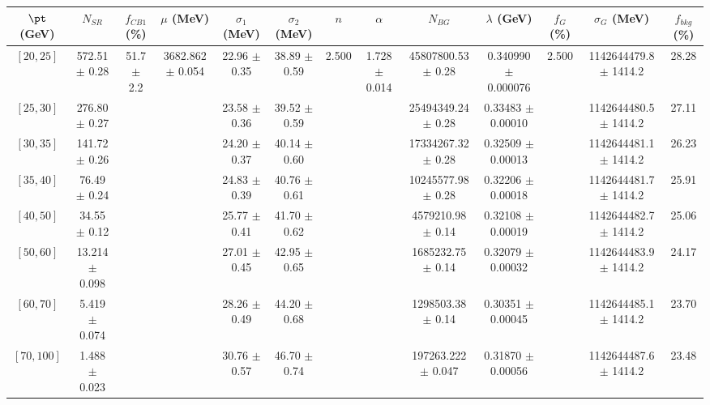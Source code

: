 \begin{tabular}{c||c|c|c|c|c|c|c|c|c|c|c||c}
$\pt$ (GeV) & $N_{SR}$ & $f_{CB1}$ (\%) & $\mu$ (MeV) & $\sigma_1$ (MeV) & $\sigma_2$ (MeV) & $n$ & $\alpha$ & $N_{BG}$ & $\lambda$ (GeV) & $f_G$ (\%) & $\sigma_G$ (MeV) & $f_{bkg}$ (\%) \\
\hline
$[20, 25]$ & 572.51 $\pm$ 0.28 & \multirow{8}{*}{51.7 $\pm$ 2.2} & \multirow{8}{*}{3682.862 $\pm$ 0.054} & 22.96 $\pm$ 0.35 & 38.89 $\pm$ 0.59 & \multirow{8}{*}{2.500} & \multirow{8}{*}{1.728 $\pm$ 0.014} & 45807800.53 $\pm$ 0.28 & 0.340990 $\pm$ 0.000076 & \multirow{8}{*}{2.500} & 1142644479.8 $\pm$ 1414.2 & 28.28\\
$[25, 30]$ & 276.80 $\pm$ 0.27 &  &  & 23.58 $\pm$ 0.36 & 39.52 $\pm$ 0.59 &  &  & 25494349.24 $\pm$ 0.28 & 0.33483 $\pm$ 0.00010 &  & 1142644480.5 $\pm$ 1414.2 & 27.11\\
$[30, 35]$ & 141.72 $\pm$ 0.26 &  &  & 24.20 $\pm$ 0.37 & 40.14 $\pm$ 0.60 &  &  & 17334267.32 $\pm$ 0.28 & 0.32509 $\pm$ 0.00013 &  & 1142644481.1 $\pm$ 1414.2 & 26.23\\
$[35, 40]$ & 76.49 $\pm$ 0.24 &  &  & 24.83 $\pm$ 0.39 & 40.76 $\pm$ 0.61 &  &  & 10245577.98 $\pm$ 0.28 & 0.32206 $\pm$ 0.00018 &  & 1142644481.7 $\pm$ 1414.2 & 25.91\\
$[40, 50]$ & 34.55 $\pm$ 0.12 &  &  & 25.77 $\pm$ 0.41 & 41.70 $\pm$ 0.62 &  &  & 4579210.98 $\pm$ 0.14 & 0.32108 $\pm$ 0.00019 &  & 1142644482.7 $\pm$ 1414.2 & 25.06\\
$[50, 60]$ & 13.214 $\pm$ 0.098 &  &  & 27.01 $\pm$ 0.45 & 42.95 $\pm$ 0.65 &  &  & 1685232.75 $\pm$ 0.14 & 0.32079 $\pm$ 0.00032 &  & 1142644483.9 $\pm$ 1414.2 & 24.17\\
$[60, 70]$ & 5.419 $\pm$ 0.074 &  &  & 28.26 $\pm$ 0.49 & 44.20 $\pm$ 0.68 &  &  & 1298503.38 $\pm$ 0.14 & 0.30351 $\pm$ 0.00045 &  & 1142644485.1 $\pm$ 1414.2 & 23.70\\
$[70, 100]$ & 1.488 $\pm$ 0.023 &  &  & 30.76 $\pm$ 0.57 & 46.70 $\pm$ 0.74 &  &  & 197263.222 $\pm$ 0.047 & 0.31870 $\pm$ 0.00056 &  & 1142644487.6 $\pm$ 1414.2 & 23.48\\
\end{tabular}
